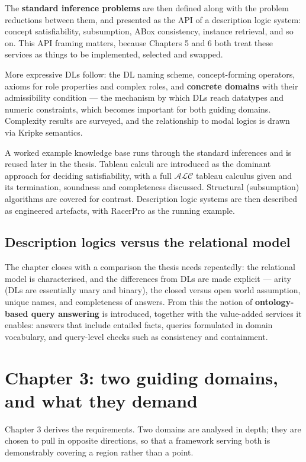 \documentclass[11pt,a4paper,DIV=12,parskip=half]{scrartcl}
\newcommand{\ALC}{\ensuremath{\mathcal{ALC}}}
\begin{document}
The \textbf{standard inference problems} are then defined along with the
problem reductions between them, and presented as the API of a description logic
system: concept satisfiability, subsumption, ABox consistency, instance
retrieval, and so on. This API framing matters, because Chapters 5 and 6 both
treat these services as things to be implemented, selected and swapped.

More expressive DLs follow: the DL naming scheme, concept-forming operators,
axioms for role properties and complex roles, and \textbf{concrete domains}
with their admissibility condition --- the mechanism by which DLs reach
datatypes and numeric constraints, which becomes important for both guiding
domains. Complexity results are surveyed, and the relationship to modal logics
is drawn via Kripke semantics.

A worked example knowledge base runs through the standard inferences and is
reused later in the thesis. Tableau calculi are introduced as the dominant
approach for deciding satisfiability, with a full \ALC{} tableau calculus given
and its termination, soundness and completeness discussed. Structural
(subsumption) algorithms are covered for contrast. Description logic systems are
then described as engineered artefacts, with RacerPro as the running example.

\subsection{Description logics versus the relational model}

The chapter closes with a comparison the thesis needs repeatedly: the relational
model is characterised, and the differences from DLs are made explicit ---
arity (DLs are essentially unary and binary), the closed versus open world
assumption, unique names, and completeness of answers. From this the notion of
\textbf{ontology-based query answering} is introduced, together with the
value-added services it enables: answers that include entailed facts, queries
formulated in domain vocabulary, and query-level checks such as consistency and
containment.

\section{Chapter 3: two guiding domains, and what they demand}

Chapter 3 derives the requirements. Two domains are analysed in depth; they are
chosen to pull in opposite directions, so that a framework serving both is
demonstrably covering a region rather than a point.
\end{document}
